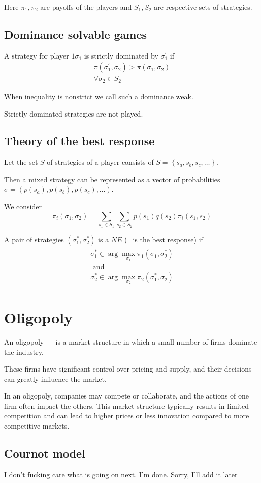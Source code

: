\documentclass[a4paper, 10pt]{article}
\begin{document}
Here $\pi_1, \pi_2$ are payoffs of the players and $S_1, S_2$ are respective sets of strategies.


\subsection{Dominance solvable games}
A strategy for player $1 \sigma_1$ is strictly dominated by $\sigma_1^{\prime}$ if
$$
\begin{gathered}
\pi\left(\sigma_1^{\prime}, \sigma_2\right)>\pi\left(\sigma_1, \sigma_2\right) \\
\forall \sigma_2 \in S_2
\end{gathered}
$$

When inequality is nonstrict we call such a dominance weak.

Strictly dominated strategies are not played.

\subsection{Theory of the best response}
 Let the set $S$ of strategies of a player consists of $S=\left\{s_a, s_b, s_c, \ldots\right\}$.

Then a mixed strategy can be represented as a vector of probabilities $\sigma=\left(p\left(s_a\right), p\left(s_b\right), p\left(s_c\right), \ldots\right)$.

We consider
$$
\pi_i\left(\sigma_1, \sigma_2\right)=\sum_{s_1 \in S_1} \sum_{s_2 \in S_2} p\left(s_1\right) q\left(s_2\right) \pi_i\left(s_1, s_2\right)
$$

 A pair of strategies $\left(\sigma_1^*, \sigma_2^*\right)$ is a $NE$ (=is the best response) if
$$\begin{aligned}
    \begin{gathered}
    \sigma_1^* \in \arg \max _{\sigma_1} \pi_1\left(\sigma_1, \sigma_2^*\right) \\
    \text { and } \\
    \sigma_2^* \in \arg \max _{\sigma_2} \pi_2\left(\sigma_1^*, \sigma_2\right)
    \end{gathered}
    \end{aligned}
$$


\section{Oligopoly}
 An oligopoly — is a market structure in which a small number of firms dominate the industry. 

These firms have significant control over pricing and supply, and their decisions can greatly influence the market. 

In an oligopoly, companies may compete or collaborate, and the actions of one firm often impact the others. This market structure typically results in limited competition and can lead to higher prices or less innovation compared to more competitive markets.

\subsection{Cournot model}
I don't fucking care what is going on next. I'm done. Sorry, I'll add it later
\end{document}
